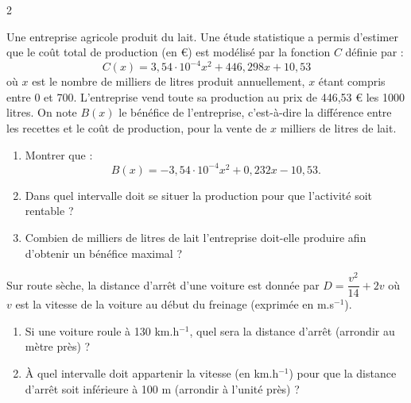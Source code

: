 \documentclass[a4paper,12pt]{article}
\begin{document}
\begin{multicols}{2}
\begin{exercice}[title=Exercice 26 \quad$\star\star$\quad\ {Modéliser}]{}{}
Une entreprise agricole produit du lait. Une étude statistique a permis d’estimer que le coût total de production (en €) est modélisé par la fonction \( C \) définie par :
\[
C(x) = 3,54 \cdot 10^{-4} x^2 + 446,298x + 10,53
\]
où \( x \) est le nombre de milliers de litres produit annuellement, \( x \) étant compris entre 0 et 700. L’entreprise vend toute sa production au prix de 446,53 € les 1000 litres. On note \( B(x) \) le bénéfice de l’entreprise, c’est-à-dire la différence entre les recettes et le coût de production, pour la vente de \( x \) milliers de litres de lait.
\begin{enumerate}
    \item Montrer que :
    \[
    B(x) = -3,54 \cdot 10^{-4} x^2 + 0,232x - 10,53.
    \]
    \item Dans quel intervalle doit se situer la production pour que l’activité soit rentable ?
    \item Combien de milliers de litres de lait l’entreprise doit-elle produire afin d’obtenir un bénéfice maximal ?
\end{enumerate}
\end{exercice}

\begin{exercice}[title=Exercice 27 \quad$\star\star$\quad\ {[Modéliser]}]{}{}
Sur route sèche, la distance d’arrêt d’une voiture est donnée par \( D = \dfrac{v^2}{14} + 2v \) où \( v \) est la vitesse de la voiture au début du freinage (exprimée en m.s\(^{-1}\)).
\begin{enumerate}
    \item Si une voiture roule à 130 km.h\(^{-1}\), quel sera la distance d’arrêt (arrondir au mètre près) ?
    \item À quel intervalle doit appartenir la vitesse (en km.h\(^{-1}\)) pour que la distance d’arrêt soit inférieure à 100 m (arrondir à l’unité près) ?
\end{enumerate}
\end{exercice}


\end{multicols}
\end{document}
